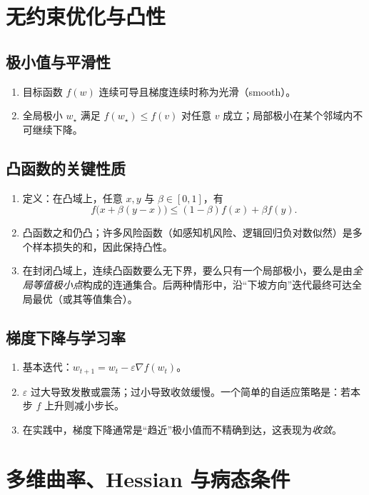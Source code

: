 \documentclass[10.5pt,hyperref,a4paper,UTF8]{ctexart}
\theoremstyle{definition}
\begin{document}
\section{无约束优化与凸性}

\subsection{极小值与平滑性}
\begin{enumerate}
  \item 目标函数 $f(w)$ 连续可导且梯度连续时称为光滑（smooth）。
  \item 全局极小 $w_\star$ 满足 $f(w_\star)\le f(v)$ 对任意 $v$ 成立；局部极小在某个邻域内不可继续下降。
\end{enumerate}

\subsection{凸函数的关键性质}
\begin{enumerate}
  \item 定义：在凸域上，任意 $x,y$ 与 $\beta\in[0,1]$，有
  \[
  f\big(x+\beta(y-x)\big)\le (1-\beta)f(x)+\beta f(y).
  \]
  \item 凸函数之和仍凸；许多风险函数（如感知机风险、逻辑回归负对数似然）是多个样本损失的和，因此保持凸性。
  \item 在封闭凸域上，连续凸函数要么无下界，要么只有一个局部极小，要么是由\emph{全局等值极小点}构成的连通集合。后两种情形中，沿“下坡方向”迭代最终可达全局最优（或其等值集合）。
\end{enumerate}

\subsection{梯度下降与学习率}
\begin{enumerate}
  \item 基本迭代：$w_{t+1}=w_t-\varepsilon\nabla f(w_t)$。
  \item $\varepsilon$ 过大导致发散或震荡；过小导致收敛缓慢。一个简单的自适应策略是：若本步 $f$ 上升则减小步长。
  \item 在实践中，梯度下降通常是“趋近”极小值而不精确到达，这表现为\emph{收敛}。
\end{enumerate}

\section{多维曲率、Hessian 与病态条件}
\end{document}
